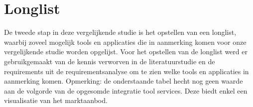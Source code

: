 \begin{enumerate}
\begin{itemize}
        
    \end{itemize}
\end{enumerate}

\section{Longlist}
\label{sec:LonglistBP}

De tweede stap in deze vergelijkende studie is het opstellen van een longlist, waarbij zoveel mogelijk tools en applicaties die in aanmerking komen voor onze vergelijkende studie worden opgelijst. Voor het opstellen van de longlist werd er gebruikgemaakt van de kennis verworven in de literatuurstudie en de requirements uit de requirementsanalyse om te zien welke tools en applicaties in aanmerking komen. Opmerking: de onderstaande tabel hecht nog geen waarde aan de volgorde van de opgesomde integratie tool services. Deze biedt enkel een visualisatie van het marktaanbod.

